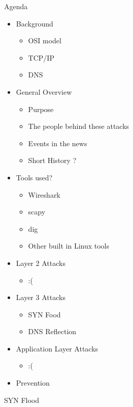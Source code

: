 \documentclass{beamer}
\begin{document}
\begin{frame}[allowframebreaks]{Agenda}
	\begin{itemize}
		\item Background
			\begin{itemize}
				\item OSI model
				\item TCP/IP
				\item DNS
			\end{itemize}
		\item General Overview
			\begin{itemize}
				\item Purpose
				\item The people behind these attacks
				\item Events in the news
				\item Short History ? %
			\end{itemize}
		\item Tools used?
			\begin{itemize}
				\item Wireshark
				\item scapy
				\item dig
				\item Other built in Linux tools %
			\end{itemize}
		\item Layer 2 Attacks
			\begin{itemize}
				\item :( %
			\end{itemize}
		\item Layer 3 Attacks 
			\begin{itemize}
				\item{SYN Food}
				\item{DNS Reflection}
			\end{itemize}
		\item Application Layer Attacks
			\begin{itemize}
				\item :( %
			\end{itemize}
		\item Prevention
	\end{itemize}
\end{frame}

\begin{frame}{SYN Flood}

\end{frame}
\end{document}
